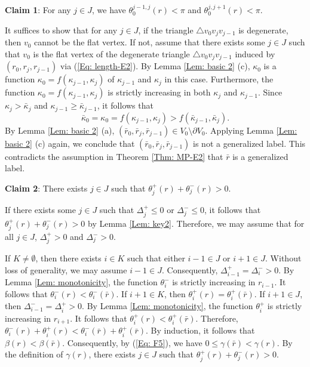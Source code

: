 \documentclass[12pt]{amsart}
\theoremstyle{definition}
\begin{document}
\textbf{Claim 1}: For any $j\in J$, we have $\theta_{0}^{j-1,j}(r)<\pi$ and $\theta_{0}^{j,j+1}(r)<\pi$.

It suffices to show that for any $j\in J$, if the triangle $\triangle v_0v_{j}v_{j-1}$ is degenerate, then $v_0$ cannot be the flat vertex. 
If not, assume that there exists some $j\in J$ such that $v_0$ is the flat vertex of the degenerate triangle $\triangle v_0v_{j}v_{j-1}$ induced by $(r_0,r_j,r_{j-1})$ via (\ref{Eq: length-E2}). 
By Lemma \ref{Lem: basic 2} (c), $\kappa_0$ is a function $\kappa_0=f(\kappa_{j-1},\kappa_{j})$ of $\kappa_{j-1}$ and $\kappa_{j}$ in this case. Furthermore, the function $\kappa_0=f(\kappa_{j-1},\kappa_{j})$ is strictly increasing in both $\kappa_j$ and $\kappa_{j-1}$. 
Since $\kappa_j>\bar{\kappa}_j$ and $\kappa_{j-1}\geq\bar{\kappa}_{j-1}$,
it follows that
\begin{equation*}
\bar{\kappa}_0=\kappa_0=f(\kappa_{j-1},\kappa_{j})
>f(\bar{\kappa}_{j-1},\bar{\kappa}_{j}).
\end{equation*}
By Lemma \ref{Lem: basic 2} (a), $(\bar{r}_0, \bar{r}_j, \bar{r}_{j-1})\in V_0\setminus \partial V_0$.
Applying Lemma \ref{Lem: basic 2} (c) again, we conclude that $(\bar{r}_0,\bar{r}_j,\bar{r}_{j-1})$ is not a generalized label. 
This contradicts the assumption in Theorem \ref{Thm: MP-E2} that $\bar{r}$ is a generalized label.


\textbf{Claim 2}: There exists $j\in J$ such that $\theta_j^+(r)+\theta_j^-(r)>0$.

If there exists some $j\in J$ such that $\Delta_j^+\leq0$ or $\Delta_j^-\leq0$,
it follows that $\theta_j^+(r)+\theta_j^-(r)>0$ by Lemma \ref{Lem: key2}. 
Therefore, we may assume that for all $j\in J$, $\Delta_j^+>0$ and $\Delta_j^->0$.

If $K\ne\emptyset$, then there exists $i\in K$ such that either $i-1\in J$ or $i+1\in J$. 
Without loss of generality, we may assume $i-1\in J$. 
Consequently, $\Delta_{i-1}^+=\Delta_i^->0$. 
By Lemma \ref{Lem: monotonicity}, the function $\theta_i^-$ is strictly increasing in $r_{i-1}$. 
It follows that $\theta_i^-(r)<\theta_i^-(\bar{r})$. 
If $i+1\in K$, then $\theta_i^+(r)=\theta_i^+(\bar{r})$. 
If $i+1\in J$, then $\Delta_{i-1}^-=\Delta_i^+>0$. 
By Lemma \ref{Lem: monotonicity}, the function $\theta_i^+$ is strictly increasing in $r_{i+1}$. 
It follows that $\theta_i^+(r)<\theta_i^+(\bar{r})$. Therefore, $\theta_i^-(r)+\theta_i^+(r)<\theta_i^-(\bar{r})+\theta_i^+(\bar{r})$.
By induction, it follows that $\beta(r)<\beta(\bar{r})$. 
Consequently, by (\ref{Eq: F5}), we have $0\leq\gamma(\bar{r})<\gamma(r)$. 
By the definition of $\gamma(r)$, there exists $j\in J$ such that $\theta_j^+(r)+\theta_j^-(r)>0$.
\end{document}
